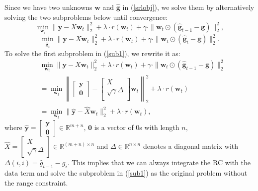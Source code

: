 \documentclass[journal]{IEEEtran}
\begin{document}
   Since we have two unknowns $\textbf{w}$ and $\hat{\textbf{g}}$ in (\ref{srlobj}), we solve them by alternatively solving the two subproblems below until convergence:
%
   \begin{equation}
     \min_{\textbf{w}_t} \|\textbf{y}-X\textbf{w}_t\|^2_2+  \lambda\cdot r(\textbf{w}_t) +\gamma  \cdot  \|\textbf{w}_t\odot (\hat{\textbf{g}}_{t-1} -\textbf{g})  \|_2^2,  \label{sub1}
   \end{equation}
     \begin{equation}
       \min_{\hat{\textbf{g}}_t} \|\textbf{y}-X\textbf{w}_t\|^2_2+  \lambda \cdot r(\textbf{w}_t) +\gamma\cdot  \|\textbf{w}_t\odot (\hat{\textbf{g}}_t -\textbf{g})  \|_2^2.\label{sub2}
 \end{equation}
   To solve the first subproblem in (\ref{sub1}),  we rewrite  it as:
   \begin{align} &\min_{\textbf{w}_t} \|\textbf{y}-X\textbf{w}_t\|^2_2+  \lambda \cdot r(\textbf{w}_t) +\gamma  \cdot  \|\textbf{w}_t\odot (\hat{\textbf{g}}_{t-1} -\textbf{g})  \|_2^2\nonumber \\
   & = \min_{\textbf{w}_t} \left\|\left[\begin{array}{c}\textbf{y}  \nonumber \\ \textbf{0}
   \end{array}\right]-
   \left[\begin{array}{c}X  \nonumber \\
   \sqrt{\gamma}\Delta   \\
   \end{array}\right]\textbf{w}_t \right\|^2_2 + \lambda\cdot r(\textbf{w}_t)\nonumber \\
   &  =  \min_{\textbf{w}_t}   \|\hat{\textbf{y}}-\hat{X}\textbf{w}_t\|^2_2+\lambda\cdot r(\textbf{w}_t),        \label{eq09}
   \end{align}
   where  $\hat{\textbf{y}}=\left[\begin{array}{c}\textbf{y} \\
   \textbf{0}
   \end{array}\right] \in \mathbb{R}^{m+n}$, $\textbf{0}$ is a vector of 0s with length $n$,  $\hat{X}=\left[\begin{array}{c}X \\
   \sqrt{\gamma}\Delta   \end{array}\right]  \in \mathbb{R}^{(m+n)\times n}$ and  $\Delta \in \mathbb{R}^{n\times n}$ denotes a diagonal matrix with $\Delta(i,i)=\hat{g}_{t-1}-g_i$.
   This implies that we can always integrate the RC with the data term and  solve the subproblem in (\ref{sub1}) as the original problem without the range constraint.
\end{document}
